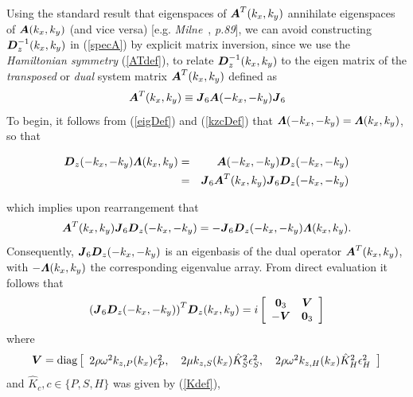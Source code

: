 Using the standard result that eigenspaces of ${\mbox{\boldmath$\mit A$\unboldmath}}^{T}({k}_{x},{k}_{y})$ annihilate
eigenspaces of ${\mbox{\boldmath$\mit A$\unboldmath}}({k}_{x},{k}_{y})$ (and vice versa) 
[e.g. {\em Milne\/}~, 
{\em p.89\/}], we can avoid constructing  ${\mbox{\boldmath$\mit D$\unboldmath}}_{z}^{-1}({k}_{x},{k}_{y})$ in (\ref{specA}) by explicit 
matrix inversion, since we use the {\em Hamiltonian symmetry\/} 
(\ref{ATdef}), to relate ${\mbox{\boldmath$\mit D$\unboldmath}}_{z}^{-1}({k}_{x},{k}_{y})$ to the eigen matrix of the 
{\em transposed\/} or {\em 
dual\/} system matrix ${\mbox{\boldmath$\mit A$\unboldmath}}^{T}({k}_{x},{k}_{y})$ defined as
\[
{\mbox{\boldmath$\mit A$\unboldmath}}^{T}({k}_{x},{k}_{y})\equiv {\mbox{\boldmath$\mit J$\unboldmath}}_6 {\mbox{\boldmath$\mit A$\unboldmath}}(-{k}_{x},-{k}_{y}) {\mbox{\boldmath$\mit J$\unboldmath}}_6
\] 
To begin, it follows from (\ref{eigDef}) and (\ref{kzcDef}) that ${\mbox{\boldmath$\mit \Lambda$\unboldmath}}(-{k}_{x},-{k}_{y})={\mbox{\boldmath$\mit \Lambda$\unboldmath}} ({k}_{x},{k}_{y})$, 
so that
\begin{samepage}
\begin{eqnarray*}
{\mbox{\boldmath$\mit D$\unboldmath}}_{z}(-{k}_{x},-{k}_{y}){\mbox{\boldmath$\mit \Lambda$\unboldmath}} ({k}_{x},{k}_{y})&=&
{\mbox{\boldmath$\mit A$\unboldmath}}(-{k}_{x},-{k}_{y}){\mbox{\boldmath$\mit D$\unboldmath}}_{z}(-{k}_{x},-{k}_{y})\\
&=&{\mbox{\boldmath$\mit J$\unboldmath}}_{6}{\mbox{\boldmath$\mit A$\unboldmath}}^{T}({k}_{x},{k}_{y}){\mbox{\boldmath$\mit J$\unboldmath}}_{6}{\mbox{\boldmath$\mit D$\unboldmath}}_{z}(-{k}_{x},-{k}_{y})
\end{eqnarray*}
\end{samepage}
which implies upon rearrangement that
\[
{\mbox{\boldmath$\mit A$\unboldmath}}^{T}({k}_{x},{k}_{y}){\mbox{\boldmath$\mit J$\unboldmath}}_{6}{\mbox{\boldmath$\mit D$\unboldmath}}_{z}(-{k}_{x},-{k}_{y})=-{\mbox{\boldmath$\mit J$\unboldmath}}_{6}
{\mbox{\boldmath$\mit D$\unboldmath}}_{z}(-{k}_{x},-{k}_{y}){\mbox{\boldmath$\mit \Lambda$\unboldmath}} ({k}_{x},{k}_{y}).
\]
Consequently, ${\mbox{\boldmath$\mit J$\unboldmath}}_{6}{\mbox{\boldmath$\mit D$\unboldmath}}_{z}(-{k}_{x},-{k}_{y})$ is an eigenbasis of the dual 
operator ${\mbox{\boldmath$\mit A$\unboldmath}}^{T}({k}_{x},{k}_{y})$, with $-{\mbox{\boldmath$\mit \Lambda$\unboldmath}} ({k}_{x},{k}_{y})$ the corresponding eigenvalue array. 
From direct evaluation it follows that
\begin{equation} \label{dinv1}
{\left({{\mbox{\boldmath$\mit J$\unboldmath}}_{6}{\mbox{\boldmath$\mit D$\unboldmath}}_{z}(-{k}_{x},-{k}_{y})}\right)}^{T}{\mbox{\boldmath$\mit D$\unboldmath}}_{z}({k}_{x},{k}_{y})= i\left[{\begin{array}{cc}{\bf 0}_{3}&{\mbox{\boldmath$\mit V$\unboldmath}}\\
-{\mbox{\boldmath$\mit V$\unboldmath}}&{\bf 0}_{3}\end{array}}\right]
\end{equation}
where
\[
{\mbox{\boldmath$\mit V$\unboldmath}}=
\mbox{diag}\left[\begin{array}{ccc}
2 \rho {\omega }^{  2}{  k}_{  z, P }({k}_{x}){\epsilon 
}_{P}^{  2},\,&
2 \mu {  k}_{  z, S }({k}_{x}) \hat{K}_{S }^{2}{\epsilon }_{S}^{  
2},\,&
2 \rho {\omega }^{  2}{  k}_{  z, H }({k}_{x}) \hat{K}_{H }^{2}{\epsilon }_{H}^{  2}
\end{array}\right]
\]
and  $\hat{K}_{c}, c\in\{P,S,H\}$ was given by (\ref{Kdef}),
